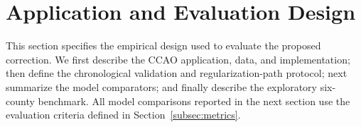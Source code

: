 \documentclass[10pt]{article}
\theoremstyle{definition}
\newcommand{\1}{\mathbf{1}}
\begin{document}














\section{Application and Evaluation Design}
\label{sec:empirical_design}

{This section specifies the empirical design used to evaluate the proposed correction. We first describe the CCAO application, data, and implementation; then define the chronological validation and regularization-path protocol; next summarize the model comparators; and finally describe the exploratory six-county benchmark. All model comparisons reported in the next section use the evaluation criteria defined in Section~\ref{subsec:metrics}.}
\end{document}
